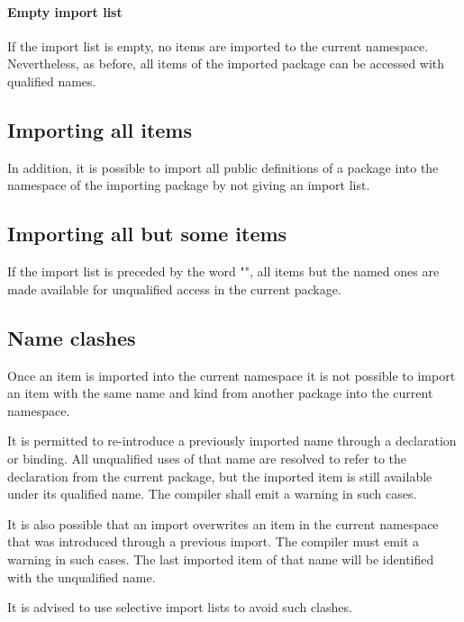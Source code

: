 \paragraph*{Empty import list} If the import list is empty, no items are imported to the current namespace. Nevertheless, as before, all items of the imported package can be accessed with qualified names.

\subsection{Importing all items}

In addition, it is possible to import all public definitions of a
package into the
namespace of the importing package by not giving an import list.


\subsection{Importing all but some items}

If the import list is preceded by the word "", all items but the named ones are made available for unqualified access in the current package.


\subsection{Name clashes}

Once an item is imported into the current namespace it is not possible
to import an item with the same name and kind from another package
into the current namespace.

It is permitted to re-introduce a previously imported name through a declaration or binding.
All unqualified uses of that name are resolved to refer to the declaration from the current package, but the imported item is still available under its qualified name.
The compiler shall emit a warning in such cases.

It is also possible that an import overwrites an item in the current namespace that was introduced through a previous import.
The compiler must emit a warning in such cases.
The last imported item of that name will be identified with the unqualified name.

It is advised to use selective import lists to avoid such clashes.


